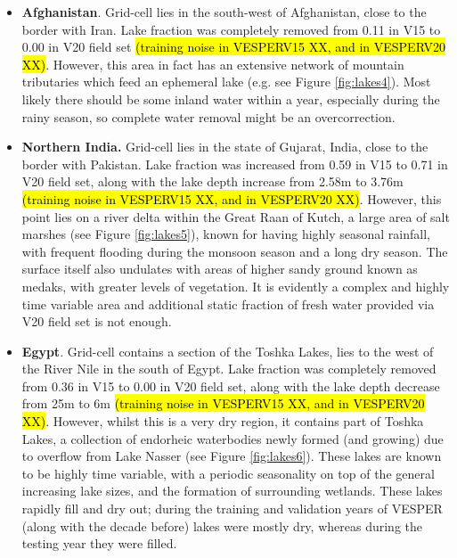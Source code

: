 \documentclass[hess, twostagejnl]{copernicus}
\begin{document}
\begin{itemize}
	\item  \textbf{Afghanistan}. Grid-cell lies in the south-west of Afghanistan, close to the border with Iran. Lake fraction was completely removed from 0.11 in V15 to 0.00 in V20 field set \hl{(training noise in VESPERV15 XX, and in VESPERV20 XX)}. However, this area in fact has an extensive network of mountain tributaries which feed an ephemeral lake (e.g. see Figure \ref{fig:lakes4}). Most likely there should be some inland water within a year, especially during the rainy season, so complete water removal might be an overcorrection.
	
	\item \textbf{Northern India.} Grid-cell lies in the state of Gujarat, India, close to the border with Pakistan. Lake fraction was increased from 0.59 in V15 to 0.71 in V20 field set, along with the lake depth increase from 2.58m to 3.76m \hl{(training noise in VESPERV15 XX, and in VESPERV20 XX)}. However, this point lies on a river delta within the Great Raan of Kutch, a large area of salt marshes (see Figure \ref{fig:lakes5}), known for having highly seasonal rainfall, with frequent flooding during the monsoon season and a long dry season. The surface itself also undulates with areas of higher sandy ground known as medaks, with greater levels of vegetation. It is evidently a complex and highly time variable area and additional static fraction of fresh water provided via V20 field set is not enough.
	\item  \textbf{Egypt}. Grid-cell contains a section of the Toshka Lakes, lies to the west of the River Nile in the south of Egypt. Lake fraction was completely removed from 0.36 in V15 to 0.00 in V20 field set, along with the lake depth decrease from 25m to 6m \hl{(training noise in VESPERV15 XX, and in VESPERV20 XX)}. However, whilst this is a very dry region, it contains part of Toshka Lakes, a collection of endorheic waterbodies newly formed (and growing) due to overflow from Lake Nasser (see Figure \ref{fig:lakes6}). These lakes are known to be highly time variable, with a periodic seasonality on top of the general increasing lake sizes, and the formation of surrounding wetlands. These lakes rapidly fill and dry out; during the training and validation years of VESPER (along with the decade before) lakes were mostly dry, whereas during the testing year they were filled. 
\end{itemize}
\end{document}
